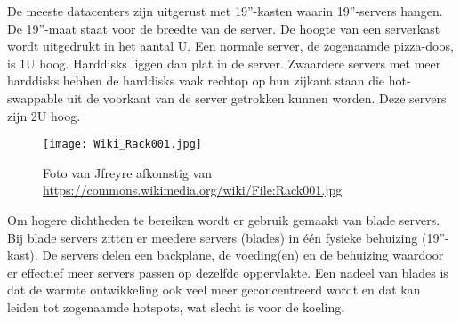 De meeste datacenters zijn uitgerust met 19''-kasten waarin 19''-servers hangen. De 19''-maat staat voor de breedte van de server. De hoogte van een serverkast wordt uitgedrukt in het aantal U. Een normale server, de zogenaamde pizza-doos, is 1U hoog. Harddisks liggen dan plat in de server. Zwaardere servers met meer harddisks hebben de harddisks vaak rechtop op hun zijkant staan die hot-swappable uit de voorkant van de server getrokken kunnen worden. Deze servers zijn 2U hoog.

\begin{figure}[H]
\texttt{[image: Wiki\_Rack001.jpg]}
	\caption{Foto van Jfreyre afkomstig van \url{https://commons.wikimedia.org/wiki/File:Rack001.jpg}}
\centering
\end{figure}

Om hogere dichtheden te bereiken wordt er gebruik gemaakt van blade servers. Bij blade servers zitten er meedere servers (blades) in \'e\'en fysieke behuizing (19''-kast). De servers delen een backplane, de voeding(en) en de behuizing waardoor er effectief meer servers passen op dezelfde oppervlakte. Een nadeel van blades is dat de warmte ontwikkeling ook veel meer geconcentreerd wordt en dat kan leiden tot zogenaamde hotspots, wat slecht is voor de koeling.
